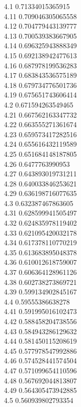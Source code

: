 {4.1	0.71334015365915\\
4.11	0.709046305065558\\
4.12	0.704779443139777\\
4.13	0.700539383667905\\
4.14	0.696325943888349\\
4.15	0.692138942477613\\
4.16	0.687978199536283\\
4.17	0.683843536575189\\
4.18	0.679734776501736\\
4.19	0.675651743606414\\
4.2	0.671594263549465\\
4.21	0.667562163347732\\
4.22	0.663555271361674\\
4.23	0.659573417282516\\
4.24	0.655616432119589\\
4.25	0.651684148187805\\
4.26	0.6477763990953\\
4.27	0.643893019731211\\
4.28	0.640033846253621\\
4.29	0.636198716077635\\
4.3	0.632387467863605\\
4.31	0.628599941505497\\
4.32	0.624835978119402\\
4.33	0.621095420032178\\
4.34	0.617378110770219\\
4.35	0.613683895048378\\
4.36	0.610012618759007\\
4.37	0.606364128961126\\
4.38	0.602738273869721\\
4.39	0.599134902845167\\
4.4	0.59555386638278\\
4.41	0.591995016102473\\
4.42	0.588458204738556\\
4.43	0.584943286129632\\
4.44	0.581450115208619\\
4.45	0.577978547992886\\
4.46	0.574528441574504\\
4.47	0.571099654110596\\
4.48	0.567692044813807\\
4.49	0.564305473942885\\
4.5	0.560939802793354\\
}
